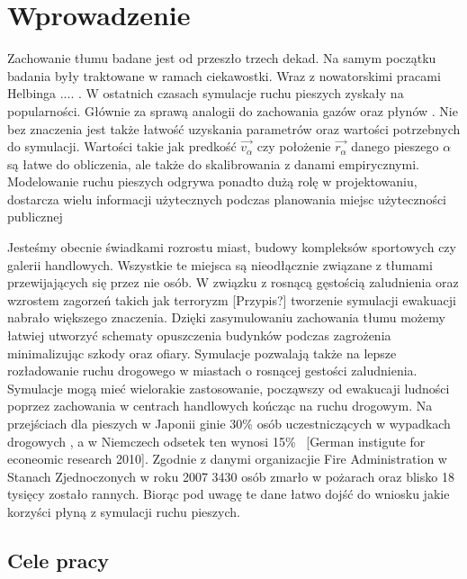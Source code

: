 \chapter{Wprowadzenie}
\label{cha:wprowadzenie}

Zachowanie tłumu badane jest od przeszło trzech dekad. Na samym początku badania były traktowane w ramach ciekawostki. Wraz z nowatorskimi pracami Helbinga .... . W ostatnich czasach symulacje ruchu pieszych zyskały na popularności. Głównie za sprawą analogii do zachowania gazów oraz płynów \cite{SforceModelForPedDyn}. Nie bez znaczenia jest także łatwość uzyskania parametrów oraz wartości potrzebnych do symulacji. Wartości takie jak predkość $\vec{v_{\alpha}}$ czy położenie $\vec{r_{\alpha}}$ danego pieszego $\alpha$ są łatwe do obliczenia, ale także do skalibrowania z danami empirycznymi. Modelowanie ruchu pieszych odgrywa ponadto dużą rolę w projektowaniu, dostarcza wielu informacji użytecznych podczas planowania miejsc użyteczności publicznej

Jesteśmy obecnie świadkami rozrostu miast, budowy kompleksów sportowych czy galerii handlowych. Wszystkie te miejsca są nieodłącznie związane z tłumami przewijających się przez nie osób. W związku z rosnącą gęstością zaludnienia oraz wzrostem zagorzeń takich jak terroryzm [Przypis?] tworzenie symulacji ewakuacji nabrało większego znaczenia. Dzięki zasymulowaniu zachowania tłumu możemy łatwiej utworzyć schematy opuszczenia budynków podczas zagrożenia minimalizując szkody oraz ofiary. Symulacje pozwalają także na lepsze rozładowanie ruchu drogowego w miastach o rosnącej gestości zaludnienia. Symulacje mogą mieć wielorakie zastosowanie, począwszy od ewakucaji ludności poprzez zachowania w centrach handlowych kończąc na ruchu drogowym. Na przejściach dla pieszych w Japonii ginie 30\% osób uczestniczących w wypadkach drogowych \cite{AMSFMfPBSaSC}, a w Niemczech odsetek ten wynosi 15\% \ [German instigute for econeomic research 2010]. Zgodnie z danymi organizacjie Fire Administration w Stanach Zjednoczonych \cite{Asfemwle} w roku 2007 3430 osób zmarło w pożarach oraz blisko 18 tysięcy zostało rannych. Biorąc pod uwagę te dane łatwo dojść do wniosku jakie korzyści płyną z symulacji ruchu pieszych.


\section{Cele pracy}
\label{sec:celePracy}


